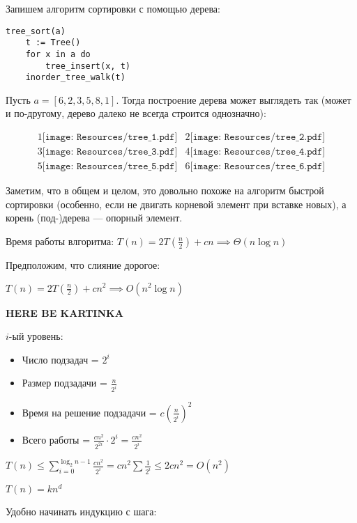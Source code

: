 \documentclass[11pt,a4paper]{article}
\begin{document}
Запишем алгоритм сортировки с помощью дерева:

\begin{lstlisting}
tree_sort(a)
    t := Tree()
    for x in a do
        tree_insert(x, t)
    inorder_tree_walk(t)
\end{lstlisting}

Пусть $a = [6,2,3,5,8,1]$. Тогда построение дерева может выглядеть так (может и по-другому, дерево далеко не всегда строится однозначно):

\[
\begin{array}{c|c}
    1\texttt{[image: Resources/tree\_1.pdf]}&
    2\texttt{[image: Resources/tree\_2.pdf]}\\\hline
    3\texttt{[image: Resources/tree\_3.pdf]}&
    4\texttt{[image: Resources/tree\_4.pdf]}\\\hline
    5\texttt{[image: Resources/tree\_5.pdf]}&
    6\texttt{[image: Resources/tree\_6.pdf]}
\end{array}\]

Заметим, что в общем и целом, это довольно похоже на алгоритм быстрой сортировки (особенно, если не двигать корневой элемент при вставке новых), а корень (под-)дерева --- опорный элемент.

Время работы влгоритма:
$T(n) = 2T(\frac n2) + cn \implies \Theta(n\log n)$

Предположим, что слияние дорогое:

$T(n) = 2T(\frac n2) + cn^2 \implies O(n^2 \log n)$

\vspace{1.5cm}
\textbf{HERE BE KARTINKA}
\vspace{1.5cm}

$i$-ый уровень:
\begin{itemize}
    \item Число подзадач = $2^i$
    \item Размер подзадачи = $\frac{n}{2^i}$
    \item Время на решение подзадачи = $c\left( \frac{n}{2^i} \right)^2$
    \item Всего работы = $\frac{cn^2}{2^{2i}}\cdot2^i = \frac{cn^2}{2^i}$
\end{itemize}

$T(n) \leqslant \sum\limits_{i=0}^{\log_2n-1}\frac{cn^2}{2^i} = cn^2 \sum \frac1{2^i} \leqslant2cn^2 = O(n^2)$

$T(n) = kn^d$

Удобно начинать индукцию с шага:
\end{document}
